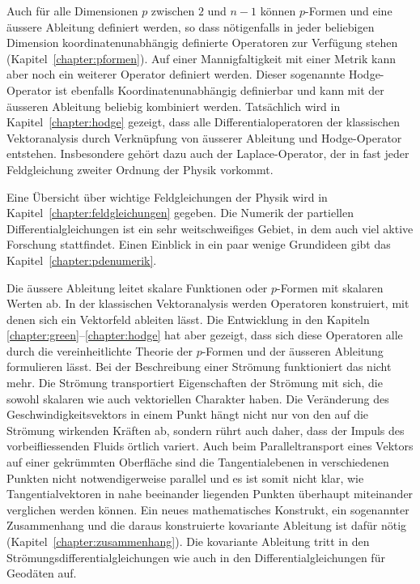 Auch für alle Dimensionen $p$ zwischen $2$ und $n-1$ können $p$-Formen und
eine äussere Ableitung definiert werden, so dass nötigenfalls 
in jeder beliebigen Dimension koordinatenunabhängig definierte
Operatoren zur Verfügung stehen (Kapitel~\ref{chapter:pformen}).
Auf einer Mannigfaltigkeit mit einer Metrik kann aber noch ein weiterer
Operator definiert werden.
Dieser sogenannte Hodge-Operator ist ebenfalls Koordinatenunabhängig
definierbar und kann mit der äusseren Ableitung beliebig kombiniert
werden.
%
Tatsächlich wird in Kapitel~\ref{chapter:hodge} gezeigt, dass alle
Differentialoperatoren der klassischen Vektoranalysis durch Verknüpfung
von äusserer Ableitung und Hodge-Operator entstehen.
Insbesondere gehört dazu auch der Laplace-Operator, der in fast
%
jeder Feldgleichung zweiter Ordnung der Physik vorkommt.

Eine Übersicht über wichtige Feldgleichungen der Physik wird
in Kapitel~\ref{chapter:feldgleichungen} gegeben.
Die Numerik der partiellen Differentialgleichungen ist ein sehr
weitschweifiges Gebiet, in dem auch viel aktive Forschung stattfindet.
Einen Einblick in ein paar wenige Grundideen gibt das
Kapitel~\ref{chapter:pdenumerik}.

Die äussere Ableitung leitet skalare Funktionen oder $p$-Formen
mit skalaren Werten ab.
In der klassischen Vektoranalysis werden Operatoren konstruiert,
mit denen sich ein Vektorfeld ableiten lässt.
Die Entwicklung in den Kapiteln \ref{chapter:green}--\ref{chapter:hodge}
hat aber gezeigt, dass sich diese Operatoren alle durch die
vereinheitlichte Theorie der $p$-Formen und der äusseren Ableitung
formulieren lässt.
Bei der Beschreibung einer Strömung funktioniert das nicht mehr.
Die Strömung transportiert Eigenschaften der Strömung mit sich,
die sowohl skalaren wie auch vektoriellen Charakter haben.
Die Veränderung des Geschwindigkeitsvektors in einem Punkt hängt
nicht nur von den auf die Strömung wirkenden Kräften ab, sondern
rührt auch daher, dass der Impuls des vorbeifliessenden Fluids
örtlich variert.
Auch beim Paralleltransport eines Vektors auf einer gekrümmten
%
Oberfläche sind die Tangentialebenen in verschiedenen Punkten nicht
notwendigerweise parallel und es ist somit nicht klar, wie
Tangentialvektoren in nahe beeinander liegenden Punkten überhaupt
miteinander verglichen werden können.
Ein neues mathematisches Konstrukt, ein sogenannter Zusammenhang
%
und die daraus konstruierte kovariante Ableitung ist dafür nötig
(Kapitel~\ref{chapter:zusammenhang}).
Die kovariante Ableitung tritt in den Strömungsdifferentialgleichungen
%
%
wie auch in den Differentialgleichungen für Geodäten auf.
%

